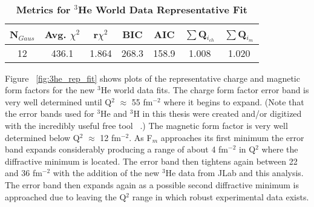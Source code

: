 
\begin{table}[!h]
\centering
\begin{tabular}{|c c c c c c c|}
\hline
\textbf{N$_{Gaus}$} & \textbf{Avg. $\chi^2$} & \textbf{r$\chi^2$} & \textbf{BIC} & \textbf{AIC} & \textbf{$\sum$Q$_{i_{ch}}$} & \textbf{$\sum$Q$_{i_{m}}$}\\
\hline
12 & 436.1 & 1.864 & 268.3 & 158.9 & 1.008 & 1.020\\
\hline
\end{tabular}
\caption{\bf{Metrics for $^3$He World Data Representative Fit}}
\label{tab:3he_rep_fit_stats}
\end{table}

Figure ~\ref{fig:3he_rep_fit} shows plots of the representative charge and magnetic form factors for the new $^3$He world data fits. The charge form factor error band is very well determined until Q$^2$ $\approx$ 55 fm$^{-2}$ where it begins to expand. (Note that the error bands used for $^3$He and $^3$H in this thesis were created and/or digitized with the incredibly useful free tool ~\cite{web_plot_digitizer}.) The magnetic form factor is very well determined below  Q$^2$ $\approx$ 12 fm$^{-2}$. As F$_m$ approaches its first minimum the error band expands considerably producing a range of about 4 fm$^{-2}$ in Q$^2$ where the diffractive minimum is located. The error band then tightens again between 22 and 36 fm$^{-2}$ with the addition of the new $^3$He data from JLab and this analysis. The error band then expands again as a possible second diffractive minimum is approached due to leaving the Q$^2$ range in which robust experimental data exists. 

